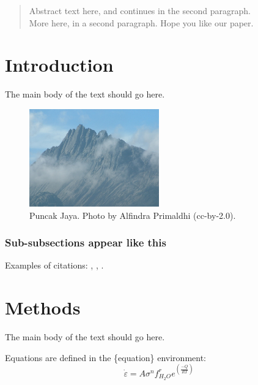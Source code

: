 \documentclass{tektonika}
\begin{document}
\maketitle
\thispagestyle{firststyle}

\begin{abstract}
Abstract text here, and continues in the second paragraph. \\

More here, in a second paragraph. Hope you like our paper. 
\end{abstract}


\section{Introduction}
The main body of the text should go here.
\lipsum[1]

\begin{figure}[h!]\centering
\includegraphics[width=0.5\textwidth]{Puncakjaya} 
\caption{Puncak Jaya. Photo by Alfindra Primaldhi (cc-by-2.0).}
\label{fig:1}
\end{figure}

\subsubsection{Sub-subsections appear like this}

Examples of citations: \citep{jordan1981},  \citet{staal2021a}, \citep[discussed by e.g.][]{staal2021a}. 


\section{Methods}
The main body of the text should go here.
\lipsum[1]




Equations are defined in the \{equation\} environment:
 \begin{equation}
\dot{\varepsilon} = A\sigma^{n} f_{H_{2}O}^{r} e^{({\frac{-Q}{RT}})}
\end{equation}
\end{document}
